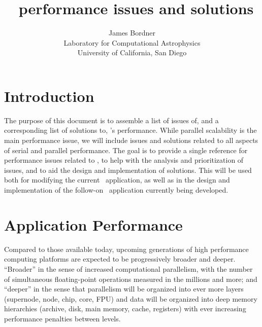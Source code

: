 \documentclass{article}
\begin{document}
\title{ {\huge \enzo\ performance issues and solutions}  \\ \vspace{0.1in}
     \vspace{-0.1in}    }
\author{ James Bordner \\
        Laboratory for Computational Astrophysics\\
        University of California, San Diego}
\maketitle

\section{Introduction}

The purpose of this document is to assemble a list of issues of, and a
corresponding list of solutions to, \enzo's performance.  While
parallel scalability is the main performance issue, we will include
issues and solutions related to all aspects of serial and parallel
performance.  The goal is to provide a single reference for
performance issues related to \enzo, to help with the analysis and
prioritization of issues, and to aid the design and implementation of
solutions.  This will be used both for modifying the current \enzo\
application, as well as in the design and implementation of the
follow-on \cello\ application currently being developed.

\section{Application Performance}

Compared to those available today, upcoming generations of high
performance computing platforms are expected to be progressively
broader and deeper.  ``Broader'' in the sense of increased
computational parallelism, with the number of simultaneous
floating-point operations measured in the millions and more; and
``deeper'' in the sense that parallelism will be organized into ever
more layers (supernode, node, chip, core, FPU) and data will be
organized into deep memory hierarchies (archive, disk, main memory,
cache, registers) with ever increasing performance penalties between
levels.
\end{document}
